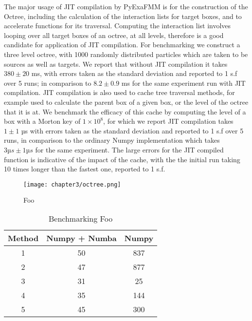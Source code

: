 The major usage of \gls{JIT} compilation by \gls{PyExaFMM} is for the construction
of the Octree, including the calculation of the interaction lists for target
boxes, and to accelerate functions for its traversal. Computing the interaction list
involves looping over all target boxes of an octree, at all levels, therefore
is a good candidate for application of \gls{JIT} compilation. For benchmarking
we construct a three level octree, with 1000 randomly distributed particles which are
taken to be sources as well as targets. We report that without \gls{JIT} compilation
it takes $380 \pm 20$ ms, with errors taken as the standard deviation
and reported to 1 s.f over 5 runs; in comparison
to $8.2 \pm 0.9$ ms for the same experiment run with \gls{JIT} compilation.
\gls{JIT} compilation is also used to cache tree traversal methods, for example
used to calculate the parent box of a given box, or the level of the octree that
it is at. We benchmark the efficacy of this cache by computing the level
of a box with a Morton key of $1 \times 10^8$, for which we report \gls{JIT} compilation
takes $1 \pm 1$ µs with errors taken as the standard deviation and reported
to 1 s.f over 5 runs, in comparison to the ordinary Numpy implementation which takes
$3 µs ± 1 µs$ for the same experiment. The large errors for the \gls{JIT} compiled
function is indicative of the impact of the cache, with the the initial
run taking 10 times longer than the fastest one, reported to 1 s.f.

\begin{figure}[ht]
    \centering

  {\texttt{[image: chapter3/octree.png]}}
  \vspace{0pt}
    \caption{
        Foo
    }
    \label{fig:3_1_octree}
\end{figure}


\begin{table}[ht]
    \centering %
    \begin{tabular}{c c c} %
    \hline\hline %
    Method & Numpy + Numba & Numpy \\ [0.5ex] %
    \hline %
    1 & 50 & 837 \\ %
    2 & 47 & 877 \\
    3 & 31 & 25 \\
    4 & 35 & 144 \\
    5 & 45 & 300 \\ [1ex] %
    \hline %
    \end{tabular}
    \label{table:3_1_jit} %
    \caption{Benchmarking Foo} %
\end{table}


